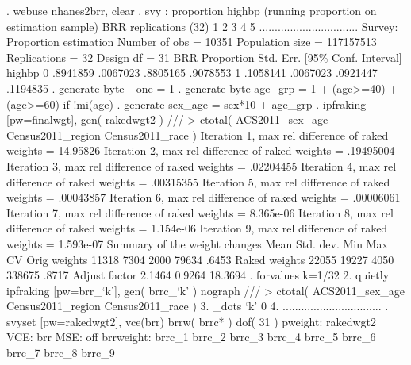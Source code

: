 . webuse nhanes2brr, clear
{\smallskip}
. svy : proportion highbp
(running proportion on estimation sample)
{\smallskip}
BRR replications (32)
 1  2  3  4  5
................................
{\smallskip}
Survey: Proportion estimation    Number of obs    =      10351
                                 Population size  =  117157513
                                 Replications     =         32
                                 Design df        =         31
{\smallskip}
             {\VBAR}                 BRR
             {\VBAR} Proportion   Std. Err.     [95\% Conf. Interval]
highbp       {\VBAR}
           0 {\VBAR}   .8941859   .0067023      .8805165    .9078553
           1 {\VBAR}   .1058141   .0067023      .0921447    .1194835
{\smallskip}
. generate byte _one = 1
{\smallskip}
. generate byte age_grp = 1 + (age>=40) + (age>=60) if !mi(age)
{\smallskip}
. generate sex_age = sex*10 + age_grp
{\smallskip}
. ipfraking [pw=finalwgt], gen( rakedwgt2 ) ///
>     ctotal( ACS2011_sex_age Census2011_region Census2011_race )
{\smallskip}
 Iteration 1, max rel difference of raked weights = 14.95826
 Iteration 2, max rel difference of raked weights = .19495004
 Iteration 3, max rel difference of raked weights = .02204455
 Iteration 4, max rel difference of raked weights = .00315355
 Iteration 5, max rel difference of raked weights = .00043857
 Iteration 6, max rel difference of raked weights = .00006061
 Iteration 7, max rel difference of raked weights = 8.365e-06
 Iteration 8, max rel difference of raked weights = 1.154e-06
 Iteration 9, max rel difference of raked weights = 1.593e-07
{\smallskip}
\cnp
   Summary of the weight changes
{\smallskip}
              {\VBAR}    Mean    Std. dev.    Min        Max       CV
Orig weights  {\VBAR}    11318       7304      2000       79634   .6453
Raked weights {\VBAR}    22055      19227      4050      338675   .8717
Adjust factor {\VBAR}   2.1464               0.9264     18.3694
{\smallskip}
. forvalues k=1/32 {\lbr}
  2.     quietly ipfraking [pw=brr_`k'], gen( brrc_`k' ) nograph ///
>         ctotal( ACS2011_sex_age Census2011_region Census2011_race )
  3.     _dots `k' 0
  4. {\rbr}
................................
. svyset [pw=rakedwgt2], vce(brr) brrw( brrc* ) dof( 31 )
{\smallskip}
      pweight: rakedwgt2
          VCE: brr
          MSE: off
    brrweight: brrc_1 brrc_2 brrc_3 brrc_4 brrc_5 brrc_6 brrc_7 brrc_8 brrc_9
